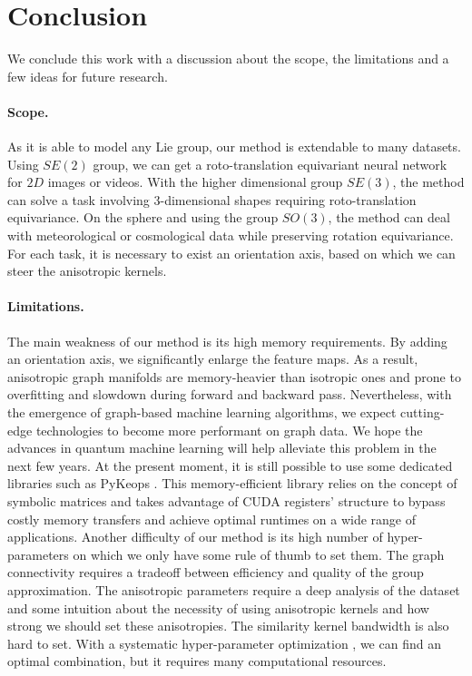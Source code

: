 \documentclass{article}
\begin{document}
\section{Conclusion} \label{sec:conclusion}

We conclude this work with a discussion about the scope, the limitations and a few ideas for future research.

\paragraph{Scope.} As it is able to model any Lie group, our method is extendable to many datasets. Using $SE(2)$ group, we can get a roto-translation equivariant neural network for $2D$ images or videos. With the higher dimensional group $SE(3)$, the method can solve a task involving 3-dimensional shapes requiring roto-translation equivariance. On the sphere and using the group $SO(3)$, the method can deal with meteorological or cosmological data while preserving rotation equivariance. For each task, it is necessary to exist an orientation axis, based on which we can steer the anisotropic kernels.

\paragraph{Limitations.} The main weakness of our method is its high memory requirements. By adding an orientation axis, we significantly enlarge the feature maps. As a result, anisotropic graph manifolds are memory-heavier than isotropic ones and prone to overfitting and slowdown during forward and backward pass. Nevertheless, with the emergence of graph-based machine learning algorithms, we expect cutting-edge technologies to become more performant on graph data. We hope the advances in quantum machine learning will help alleviate this problem in the next few years. At the present moment, it is still possible to use some dedicated libraries such as PyKeops \citep{charlier2020kernel}. This memory-efficient library relies on the concept of symbolic matrices and takes advantage of CUDA registers' structure to bypass costly memory transfers and achieve optimal runtimes on a wide range of applications. Another difficulty of our method is its high number of hyper-parameters on which we only have some rule of thumb to set them. The graph connectivity requires a tradeoff between efficiency and quality of the group approximation. The anisotropic parameters require a deep analysis of the dataset and some intuition about the necessity of using anisotropic kernels and how strong we should set these anisotropies. The similarity kernel bandwidth is also hard to set. With a systematic hyper-parameter optimization \citep{yu2020hyper}, we can find an optimal combination, but it requires many computational resources.
\end{document}
